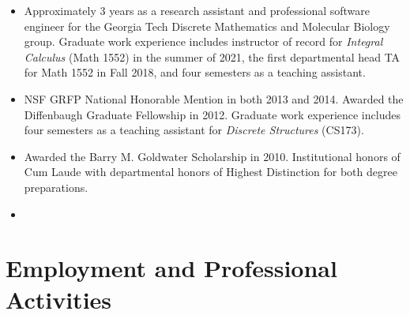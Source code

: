 \documentclass[10pt,letterpaper,sans]{moderncv}        %
\begin{document}
\begin{itemize}
     \setlength{\itemsep}{1.5mm} 

\item[] 
     {\small 
        Approximately 3 years as a 
        research assistant and professional software engineer 
        for the Georgia Tech Discrete Mathematics and Molecular Biology group. 
        Graduate work experience includes instructor of record for \emph{Integral Calculus} (Math 1552) 
        in the summer of 2021, the first departmental head TA for Math 1552 in Fall 2018, and four semesters 
        as a teaching assistant. 
     } 

\item[] 
     {\small 
        NSF GRFP National Honorable Mention in both 
        2013 and 2014. Awarded the Diffenbaugh Graduate Fellowship in 2012. 
        Graduate work experience includes four semesters as a teaching assistant for 
        \emph{Discrete Structures} (CS173). 
     } 

\item[] 
     {\small 
        Awarded the Barry M. Goldwater Scholarship in 2010. 
        Institutional honors of Cum Laude with departmental honors of Highest Distinction for both 
        degree preparations.  
     } 

\item[]  

\end{itemize}

\vspace{-0.15in} 
\section{Employment and Professional Activities} 
\end{document}
